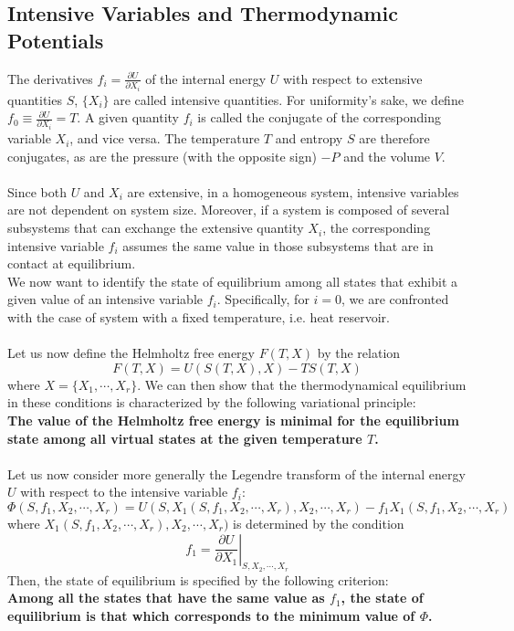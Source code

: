 \subsection{Intensive Variables and Thermodynamic Potentials}
The derivatives $f_i = \frac{\partial U}{\partial X_i}$ of the internal energy $U$ with respect to extensive quantities $S$, $\{X_i\}$ are called intensive quantities. For uniformity's sake, we define $f_0 \equiv \frac{\partial U}{\partial X_i} = T$. A given quantity $f_i$ is called the conjugate of the corresponding variable $X_i$, and vice versa. The temperature $T$ and entropy $S$ are therefore conjugates, as are the pressure (with the opposite sign) $-P$ and the volume $V$.
\\ \\
Since both $U$ and $X_i$ are extensive, in a homogeneous system, intensive variables are not dependent on system size. Moreover, if a system is composed of several subsystems that can exchange the extensive quantity $X_i$, the corresponding intensive variable $f_i$ assumes the same value in those subsystems that are in contact at equilibrium.
\\
We now want to identify the state of equilibrium among all states that exhibit a given value of an intensive variable $f_i$. Specifically, for $i = 0$, we are confronted with the case of system with a fixed temperature, i.e. heat reservoir.
\\ \\
Let us now define the Helmholtz free energy $F(T,X) $ by the relation
\[F(T,X) = U(S(T,X),X) - TS(T,X)\]
where $X = \{ X_1,\cdots,X_r\}$.
We can then show that the thermodynamical equilibrium in these conditions is characterized by the following variational principle:
\\
\textbf{The value of the Helmholtz free energy is minimal for the equilibrium state among all virtual states at the given temperature $T$.}
\\ \\
Let us now consider more generally the Legendre transform of the internal energy $U$ with respect to the intensive variable $f_i$:
\[\Phi(S,f_1,X_2,\cdots,X_r) = U(S,X_1(S,f_1,X_2,\cdots,X_r),X_2,\cdots,X_r) - f_1 X_1 (S,f_1,X_2,\cdots,X_r)\]
where $X_1(S,f_1,X_2,\cdots,X_r),X_2,\cdots,X_r)$ is determined by the condition
\[f_1 =\left. \frac{\partial U}{\partial X_1} \right |_{S,X_2,\cdots,X_r}\]
Then, the state of equilibrium is specified by the following criterion:
\\
\textbf{Among all the states that have the same value as $f_1$, the state of equilibrium is that which corresponds to the minimum value of $\Phi$.}

